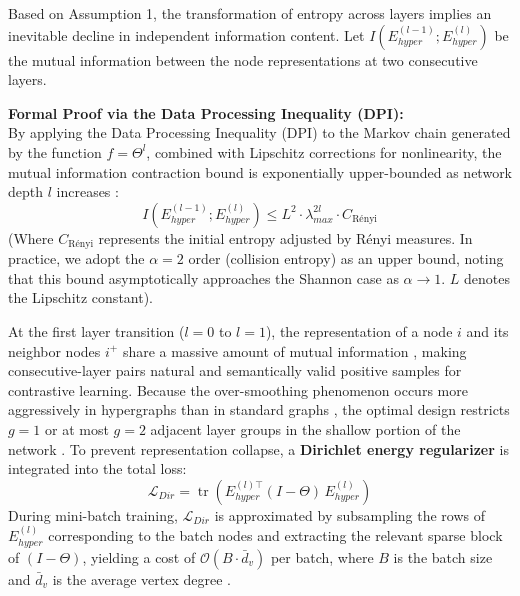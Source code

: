     \begin{theorem}
    \label{thm:hypergraph-mi}
    Based on Assumption 1, the transformation of entropy across layers implies an inevitable decline in independent information content. Let $I(E_{hyper}^{(l-1)}; E_{hyper}^{(l)})$ be the mutual information between the node representations at two consecutive layers. 
    
    \medskip
    \noindent\textbf{Formal Proof via the Data Processing Inequality (DPI):} \\
    By applying the Data Processing Inequality (DPI) \cite{cover2006elements} to the Markov chain generated by the function $f = \Theta^l$, combined with Lipschitz corrections for nonlinearity, the mutual information contraction bound is exponentially upper-bounded as network depth $l$ increases \cite{he2021hypergraphfiltering, kim2024miheterophilygnn}:
    \begin{equation}
    I(E_{hyper}^{(l-1)}; E_{hyper}^{(l)}) \le L^2 \cdot \lambda_{max}^{2l} \cdot C_{\text{R\'enyi}}
    \end{equation}
    (Where $C_{\text{R\'enyi}}$ represents the initial entropy adjusted by R\'enyi measures. In practice, we adopt the $\alpha=2$ order (collision entropy) as an upper bound, noting that this bound asymptotically approaches the Shannon case as $\alpha \to 1$. $L$ denotes the Lipschitz constant).
    \end{theorem}
    
    \begin{corollary}
    \label{cor:positive-pairs}
    At the first layer transition ($l=0$ to $l=1$), the representation of a node $i$ and its neighbor nodes $i^+$ share a massive amount of mutual information \cite{wayama2023lowpassgsp}, making consecutive-layer pairs natural and semantically valid positive samples for contrastive learning. Because the over-smoothing phenomenon occurs more aggressively in hypergraphs than in standard graphs \cite{openreview2025hypergraphquantization}, the optimal design restricts $g=1$ or at most $g=2$ adjacent layer groups in the shallow portion of the network \cite{guo2025mmhcl, feng2025nlgcl}. To prevent representation collapse, a \textbf{Dirichlet energy regularizer} is integrated into the total loss:
    \begin{equation}\label{eq:dirichlet}
    \mathcal{L}_{Dir} = \operatorname{tr}\!\left(E_{hyper}^{(l)\top}(I - \Theta)\,E_{hyper}^{(l)}\right)
    \end{equation}
    During mini-batch training, $\mathcal{L}_{Dir}$ is approximated by subsampling the rows of $E_{hyper}^{(l)}$ corresponding to the batch nodes and extracting the relevant sparse block of $(I-\Theta)$, yielding a cost of $\mathcal{O}(B \cdot \bar{d}_{v})$ per batch, where $B$ is the batch size and $\bar{d}_{v}$ is the average vertex degree \cite{ma2025particlesystemhypergraph}.
    \end{corollary}
    
